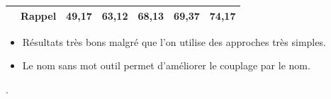 \documentclass{beamer}
\begin{document}
\begin{frame}[label=distance-nom]
{\begin{tabular}{ccccccc}
				\multicolumn{1}{c}{}                                                                                   & Rappel                & \textbf{49,17} & 63,12 & \textbf{68,13}                     & \textbf{69,37}                    & 74,17           \\ \bottomrule
			\end{tabular}
		} %
		\bigskip
		\begin{itemize}
			\item<2-> Résultats très bons malgré que l'on utilise des approches très simples.
			\item<3-> Le nom sans mot outil permet d'améliorer le couplage par le nom.
		\end{itemize}
		.
	\end{frame}
	
\end{document}
